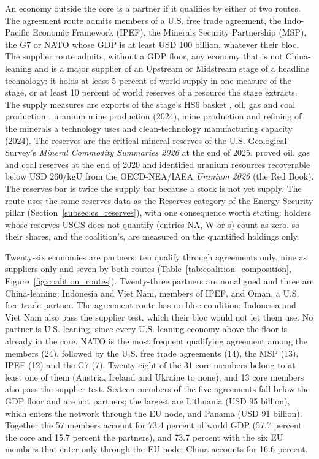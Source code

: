An economy outside the core is a partner if it qualifies by either of two routes. The agreement
route admits members of a U.S. free trade agreement, the Indo-Pacific Economic Framework (IPEF),
the Minerals Security Partnership (MSP), the G7 or NATO whose GDP is at least USD 100 billion,
whatever their bloc. The supplier route admits, without a GDP floor, any economy that is not
China-leaning and is a major supplier of an Upstream or Midstream stage of a headline technology:
it holds at least 5 percent of world supply in one measure of the stage, or at least 10 percent
of world reserves of a resource the stage extracts. The supply measures are exports of the
stage's HS6 basket \citep[2023;][]{growthlab2019trade}, oil, gas and coal production
\citep[2025;][]{ei2026statistical}, uranium mine production (2024), mine production and refining
of the minerals a technology uses \citep[2025;][with manganese, zinc and platinum-group metals
from the Energy Institute]{iea2026cmdata} and clean-technology manufacturing capacity (2024). The
reserves are the critical-mineral reserves of the U.S. Geological Survey's \emph{Mineral
Commodity Summaries 2026} at the end of 2025, proved oil, gas and coal reserves at the end of 2020
\citep{ei2026statistical} and identified uranium resources recoverable below USD 260/kgU from the
OECD-NEA/IAEA \emph{Uranium 2026} (the Red Book). The reserves bar is twice the supply bar because
a stock is not yet supply. The route uses the same reserves data as the Reserves category of the
Energy Security pillar (Section~\ref{subsec:es_reserves}), with one consequence worth stating:
holders whose reserves USGS does not quantify (entries NA, W or s) count as zero, so their shares,
and the coalition's, are measured on the quantified holdings only.

Twenty-six economies are partners: ten qualify through agreements only, nine as suppliers only and
seven by both routes (Table~\ref{tab:coalition_composition}, Figure~\ref{fig:coalition_routes}).
Twenty-three partners are nonaligned and three are China-leaning: Indonesia and Viet Nam, members
of IPEF, and Oman, a U.S. free-trade partner. The agreement route has no bloc condition; Indonesia
and Viet Nam also pass the supplier test, which their bloc would not let them use. No partner is
U.S.-leaning, since every U.S.-leaning economy above the floor is already in the core. NATO is the
most frequent qualifying agreement among the members (24), followed by the U.S. free trade
agreements (14), the MSP (13), IPEF (12) and the G7 (7). Twenty-eight of the 31 core members
belong to at least one of them (Austria, Ireland and Ukraine to none), and 13 core members also
pass the supplier test. Sixteen members of the five agreements fall below the GDP floor and are
not partners; the largest are Lithuania (USD 95 billion), which enters the network through the EU
node, and Panama (USD 91 billion). Together the 57 members account for 73.4 percent of world GDP
(57.7 percent the core and 15.7 percent the partners), and 73.7 percent with the six EU members
that enter only through the EU node; China accounts for 16.6 percent.

